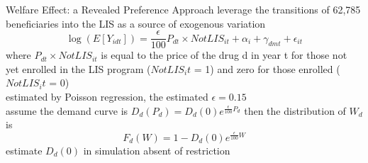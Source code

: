 \begin{frame}{Welfare Effect: a Revealed Preference Approach}
    leverage the transitions of 62,785 beneficiaries into the LIS as a source of exogenous variation \\
    \begin{equation}
        \log(E[Y_{idt}])=\frac{\epsilon}{100}P_{dt}\times NotLIS_{it} + \alpha_i + \gamma_{dmt} + \epsilon_{it}
    \end{equation}
    where $P_{dt}\times NotLIS_{it}$ is equal to the price of the drug d in year t for those not yet enrolled in the LIS program ($NotLIS_it$ = 1) and zero for those enrolled ($NotLIS_it$ = 0) \\
    estimated by Poisson regression, the estimated $\epsilon = 0.15$ \\
    assume the demand curve is $D_d(P_d) = D_d(0)e^{\frac{\epsilon}{100}P_d}$
    then the distribution of $W_d$ is $$F_d(W)=1-D_d(0)e^{\frac{\epsilon}{100}W}$$
    estimate $D_d(0)$ in simulation absent of restriction
\end{frame}


